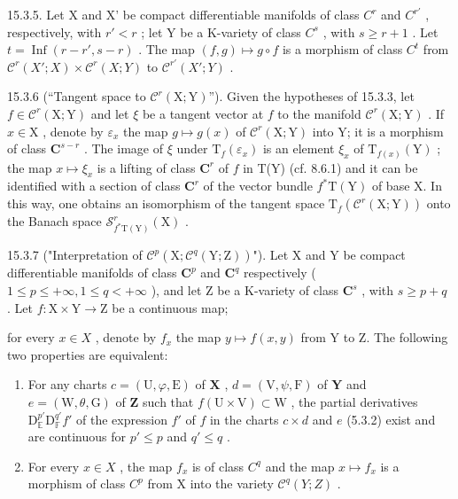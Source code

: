 15.3.5. Let X and X' be compact differentiable manifolds of class \(C^{r}\) and \(C^{r'}\) , respectively, with \(r' < r\) ; let Y be a K-variety of class \(C^{s}\) , with \(s \geqslant r + 1\) . Let \(t = \operatorname{Inf}(r - r', s - r)\) . The map \((f, g) \mapsto g \circ f\) is a morphism of class \(C^{t}\) from \(\mathcal{C}^{r}(X'; X) \times \mathcal{C}^{r}(X; Y)\) to \(\mathcal{C}^{r'}(X'; Y)\) .

15.3.6 (“Tangent space to \(\mathcal{C}^r (\mathrm{X};\mathrm{Y})\)”). Given the hypotheses of 15.3.3, let \(f\in \mathcal{C}^r (\mathrm{X};\mathrm{Y})\) and let \(\xi\) be a tangent vector at \(f\) to the manifold \(\mathcal{C}^r (\mathrm{X};\mathrm{Y})\) . If \(x\in \mathrm{X}\) , denote by \(\varepsilon_{x}\) the map \(g\mapsto g(x)\) of \(\mathcal{C}^r (\mathrm{X};\mathrm{Y})\) into Y; it is a morphism of class \(\mathbf{C}^{s - r}\) . The image of \(\xi\) under \(\mathrm{T}_f(\varepsilon_x)\) is an element \(\xi_{x}\) of \(\mathrm{T}_{f(x)}(\mathrm{Y})\) ; the map \(x\mapsto \xi_{x}\) is a lifting of class \(\mathbf{C}^r\) of \(f\) in T(Y) (cf. 8.6.1) and it can be identified with a section of class \(\mathbf{C}^r\) of the vector bundle \(f^{*}\mathrm{T}(\mathrm{Y})\) of base X. In this way, one obtains an isomorphism of the tangent space \(\mathrm{T}_f(\mathcal{C}^r (\mathrm{X};\mathrm{Y}))\) onto the Banach space \(\mathcal{S}_{f^{*}\mathrm{T}(\mathrm{Y})}^r (\mathrm{X})\) .

15.3.7 ("Interpretation of \(\mathcal{C}^{p}(\mathrm{X};\mathcal{C}^{q}(\mathrm{Y};\mathrm{Z}))\)"). Let X and Y be compact differentiable manifolds of class \(\mathbf{C}^{p}\) and \(\mathbf{C}^{q}\) respectively ( \(1\leqslant p\leqslant+\infty,1\leqslant q<+\infty\) ), and let Z be a K-variety of class \(\mathbf{C}^{s}\) , with \(s\geqslant p+q\) . Let \(f\colon\mathrm{X}\times\mathrm{Y}\to\mathrm{Z}\) be a continuous map;

for every \(x \in X\) , denote by \(f_x\) the map \(y \mapsto f(x, y)\) from Y to Z. The following two properties are equivalent:

\begin{enumerate}
\def\labelenumi{\alph{enumi})}
\item
  For any charts \(c = (\mathrm{U}, \varphi, \mathrm{E})\) of \(\mathbf{X}\) , \(d = (\mathrm{V}, \psi, \mathrm{F})\) of \(\mathbf{Y}\) and \(e = (\mathrm{W}, \theta, \mathrm{G})\) of \(\mathbf{Z}\) such that \(f(\mathrm{U} \times \mathrm{V}) \subset \mathrm{W}\) , the partial derivatives \(\mathrm{D}_{\mathbb{E}}^{p'} \mathrm{D}_{\mathbb{F}}^{q'} f'\) of the expression \(f'\) of \(f\) in the charts \(c \times d\) and \(e\) (5.3.2) exist and are continuous for \(p' \leqslant p\) and \(q' \leqslant q\) .
\item
  For every \(x \in X\) , the map \(f_{x}\) is of class \(C^{q}\) and the map \(x \mapsto f_{x}\) is a morphism of class \(C^{p}\) from X into the variety \(\mathcal{C}^{q}(Y; Z)\) .
\end{enumerate}


